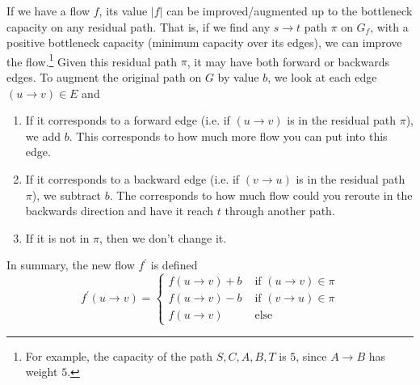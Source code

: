 \documentclass{article}
\begin{document}
    \begin{theorem}
      If we have a flow $f$, its value $|f|$ can be improved/augmented up to the bottleneck capacity on any residual path. That is, if we find any $s \rightarrow t$ path $\pi$ on $G_f$, with a positive bottleneck capacity (minimum capacity over its edges), we can improve the flow.\footnote{For example, the capacity of the path $S, C, A, B, T$ is $5$, since $A \rightarrow B$ has weight $5$.} Given this residual path $\pi$, it may have both forward or backwards edges. To augment the original path on $G$ by value $b$, we look at each edge $(u \rightarrow v) \in E$ and 
      \begin{enumerate}
        \item If it corresponds to a forward edge (i.e. if $(u \rightarrow v)$ is in the residual path $\pi$), we add $b$. This corresponds to how much more flow you can put into this edge. 
        \item If it corresponds to a backward edge (i.e. if $(v \rightarrow u)$ is in the residual path $\pi$), we subtract $b$. The corresponds to how much flow could you reroute in the backwards direction and have it reach $t$ through another path.   
        \item If it is not in $\pi$, then we don't change it. 
      \end{enumerate}
      In summary, the new flow $f^\prime$ is defined 
      \begin{equation}
        f^\prime (u \rightarrow v) = \begin{cases} 
          f(u \rightarrow v) + b & \text{ if } (u \rightarrow v) \in \pi \\ 
          f(u \rightarrow v) - b & \text{ if } (v \rightarrow u) \in \pi \\  
          f(u \rightarrow v) & \text{ else }
        \end{cases}
      \end{equation}
    \end{theorem} 
\end{document}
